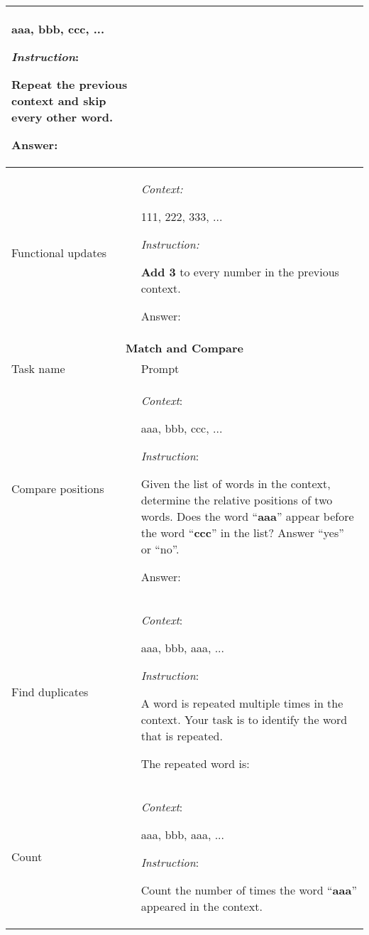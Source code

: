 \begin{longtable}{p{3cm}p{12cm}}
        aaa, bbb, ccc, ...
        
        \textit{Instruction}:
        
        Repeat the previous context and skip every \textbf{other} word.
        
        Answer: \\
        \midrule

        Functional updates & \textit{Context:}

        111, 222, 333, ...
        
        
        \textit{Instruction:}
        
        \textbf{Add 3} to every number in the previous context.
        
        Answer: \\
        \bottomrule
        \toprule
        \multicolumn{2}{c}{\textbf{Match and Compare} } \\
        \midrule
         Task name & Prompt  \\
        \midrule

        Compare positions & \textit{Context}:
        
        aaa, bbb, ccc, ...
        
        \textit{Instruction}:
        
        Given the list of words in the context, determine the relative positions of two words. Does the word ``\textbf{aaa}'' appear before the word ``\textbf{ccc}'' in the list? Answer ``yes'' or ``no''.
        
        Answer: \\

        \midrule

        Find duplicates & \textit{Context}:
        
        aaa, bbb, aaa, ...
        
        \textit{Instruction}:
        
        A word is repeated multiple times in the context. Your task is to identify the word that is repeated.
        
        The repeated word is: \\

        \midrule

        Count & \textit{Context}:
        
        aaa, bbb, aaa, ...
        
        \textit{Instruction}: 
        
        Count the number of times the word ``\textbf{aaa}'' appeared in the context.
        

\end{longtable}
